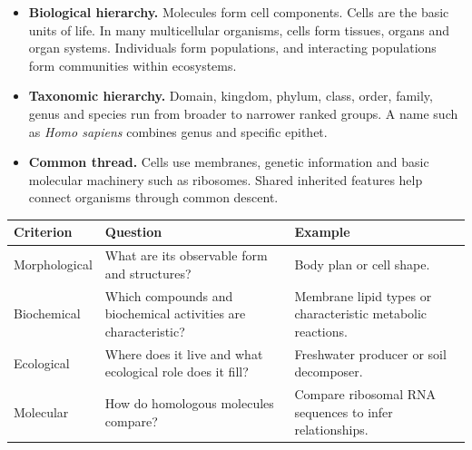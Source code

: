 \documentclass[12pt,a4paper]{article}
\begin{document}
\begin{itemize}[leftmargin=*, itemsep=3pt, topsep=4pt]
  \item \textbf{Biological hierarchy.} Molecules form cell components. Cells are the basic units of life. In many multicellular organisms, cells form tissues, organs and organ systems. Individuals form populations, and interacting populations form communities within ecosystems.
  \item \textbf{Taxonomic hierarchy.} Domain, kingdom, phylum, class, order, family, genus and species run from broader to narrower ranked groups. A name such as \textit{Homo sapiens} combines genus and specific epithet.
  \item \textbf{Common thread.} Cells use membranes, genetic information and basic molecular machinery such as ribosomes. Shared inherited features help connect organisms through common descent.
\end{itemize}
\par\vspace{5pt}
\begingroup
\setlength{\extrarowheight}{1pt}
\noindent\begin{tabularx}{\linewidth}{|B{3.2cm}|Y|Y|}
\hline
\textbf{Criterion} & \textbf{Question} & \textbf{Example} \\ \hline
Morphological & What are its observable form and structures? & Body plan or cell shape. \\ \hline
Biochemical & Which compounds and biochemical activities are characteristic? & Membrane lipid types or characteristic metabolic reactions. \\ \hline
Ecological & Where does it live and what ecological role does it fill? & Freshwater producer or soil decomposer. \\ \hline
Molecular & How do homologous molecules compare? & Compare ribosomal RNA sequences to infer relationships. \\ \hline
\end{tabularx}\par
\endgroup
\end{document}
